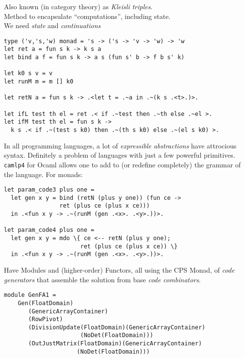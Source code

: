 \documentclass[landscape]{slides}
\begin{document}
\begin{slide}
    Also known (in category theory) as \emph{Kleisli triples}.\\
    Method to encapsulate ``computations'', including state.\\
    We need \emph{state} and \emph{continuations}
\begin{verbatim}
type ('v,'s,'w) monad = 's -> ('s -> 'v -> 'w) -> 'w
let ret a = fun s k -> k s a
let bind a f = fun s k -> a s (fun s' b -> f b s' k)

let k0 s v = v
let runM m = m [] k0

let retN a = fun s k -> .<let t = .~a in .~(k s .<t>.)>.

let ifL test th el = ret .< if .~test then .~th else .~el >.
let ifM test th el = fun s k ->
  k s .< if .~(test s k0) then .~(th s k0) else .~(el s k0) >.
\end{verbatim}
\end{slide}

\begin{slide}
    In all programming languages, a lot of \emph{expressible abstractions}
    have attrocious syntax.  Definitely a problem of languages with
    just a few powerful primitives. \texttt{camlp4} for Ocaml allows one to add
    to (or redefine completely) the grammar of the language.  For monads:
\begin{verbatim}
let param_code3 plus one =
  let gen x y = bind (retN (plus y one)) (fun ce -> 
                ret (plus ce (plus x ce)))
  in .<fun x y -> .~(runM (gen .<x>. .<y>.))>.

let param_code4 plus one =
  let gen x y = mdo \{ ce <-- retN (plus y one);
                      ret (plus ce (plus x ce)) \}
  in .<fun x y -> .~(runM (gen .<x>. .<y>.))>.
\end{verbatim}
\end{slide}

\begin{slide}
    Have Modules and (higher-order) Functors, all using the CPS Monad, of
    \emph{code generators} that assemble the solution from base \emph{code
    combinators}.
\begin{verbatim}
module GenFA1 = 
    Gen(FloatDomain)
       (GenericArrayContainer)
       (RowPivot)
       (DivisionUpdate(FloatDomain)(GenericArrayContainer)
                      (NoDet(FloatDomain)))
       (OutJustMatrix(FloatDomain)(GenericArrayContainer)
                     (NoDet(FloatDomain)))
\end{verbatim}
\end{slide}
\end{document}
